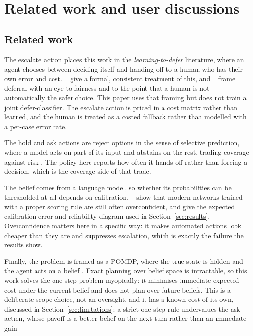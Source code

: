 \documentclass{article}
\begin{document}
\section{Related work and user discussions}
\label{sec:related}

\subsection{Related work}
The escalate action places this work in the \emph{learning-to-defer} literature,
where an agent chooses between deciding itself and handing off to a human who has
their own error and cost. \citeauthor{mozannar2020}~ give
a formal, consistent
treatment of this, and \citeauthor{madras2018}~ frame
deferral with an eye to fairness
and to the point that a human is not automatically the safer choice. This paper
uses that framing but does not train a joint defer-classifier. The escalate
action is priced in a cost matrix rather than learned, and the human is treated
as a costed fallback rather than modelled with a per-case error rate.

The hold and ask actions are reject options in the sense of selective
prediction, where a model acts on part of its input and abstains on the rest,
trading coverage against risk \cite{geifman2017}. The policy here reports how
often it hands off rather than forcing a decision, which is the coverage side of
that trade.

The belief comes from a language model, so whether its probabilities can be
thresholded at all depends on calibration. \citeauthor{guo2017}~
show that modern
networks trained with a proper scoring rule are still often overconfident, and
give the expected calibration error and reliability diagram used in
Section~\ref{sec:results}. Overconfidence matters here in a specific way: it
makes automated actions look cheaper than they are and suppresses escalation,
which is exactly the failure the results show.

Finally, the problem is framed as a POMDP, where the true state is hidden and the
agent acts on a belief \cite{kaelbling1998}. Exact planning over belief space is
intractable, so this work solves the one-step problem myopically: it minimises
immediate expected cost under the current belief and does not plan over future
beliefs. This is a deliberate scope choice, not an oversight, and it has a known
cost of its own, discussed in Section~\ref{sec:limitations}: a strict one-step
rule undervalues the ask action, whose payoff is a better belief on the next
turn rather than an immediate gain.
\end{document}
